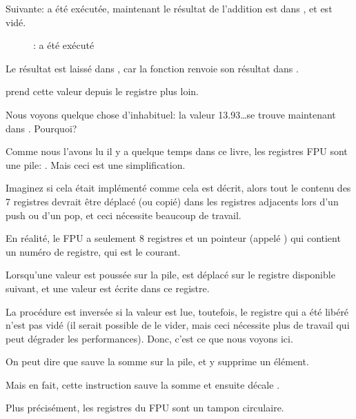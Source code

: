 \clearpage
Suivante: \FADDP a été exécutée, maintenant le résultat de l'addition est dans ,
et  est vidé.

\begin{figure}[H]
\centering
{}
\caption{\olly: \FADDP a été exécuté}
\label{fig:FPU_simple_olly_5}
\end{figure}

Le résultat est laissé dans , car la fonction renvoie son résultat dans .

\main prend cette valeur depuis le registre plus loin.

Nous voyons quelque chose d'inhabituel: la valeur 13.93\ldots se trouve maintenant
dans .
Pourquoi?

\label{FPU_is_rather_circular_buffer}

Comme nous l'avons lu il y a quelque temps dans ce livre, les registres \ac{FPU} sont
une pile: .
Mais ceci est une simplification.

Imaginez si cela était implémenté  comme cela est décrit, alors
tout le contenu des 7 registres devrait être déplacé (ou copié) dans les registres
adjacents lors d'un push ou d'un pop, et ceci nécessite beaucoup de travail.

En réalité, le \ac{FPU} a seulement 8 registres et un pointeur (appelé )
qui contient un numéro de registre, qui est le  courant.

Lorsqu'une valeur est poussée sur la pile,  est déplacé sur le registre
disponible suivant, et une valeur est écrite dans ce registre.

La procédure est inversée si la valeur est lue, toutefois, le registre qui a été
libéré n'est pas vidé (il serait possible de le vider, mais ceci nécessite plus de
travail qui peut dégrader les performances).
Donc, c'est ce que nous voyons ici.

On peut dire que \FADDP sauve la somme sur la pile, et y supprime un élément.

Mais en fait, cette instruction sauve la somme et ensuite décale .

Plus précisément, les registres du  \ac{FPU} sont un tampon circulaire.

